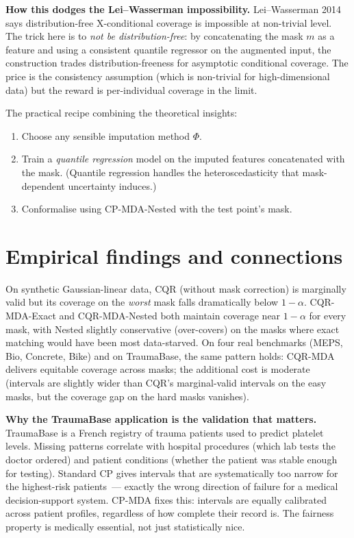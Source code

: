\documentclass[letterpaper,11pt,leqno]{article}
\begin{document}
\begin{keyinsight}
\textbf{How this dodges the Lei--Wasserman impossibility.} Lei--Wasserman 2014 says distribution-free X-conditional coverage is impossible at non-trivial level. The trick here is to \emph{not be distribution-free}: by concatenating the mask $m$ as a feature and using a consistent quantile regressor on the augmented input, the construction trades distribution-freeness for asymptotic conditional coverage. The price is the consistency assumption (which is non-trivial for high-dimensional data) but the reward is per-individual coverage in the limit.
\end{keyinsight}

The practical recipe combining the theoretical insights:
\begin{enumerate}
\item Choose any sensible imputation method $\Phi$.
\item Train a \emph{quantile regression} model on the imputed features concatenated with the mask. (Quantile regression handles the heteroscedasticity that mask-dependent uncertainty induces.)
\item Conformalise using CP-MDA-Nested with the test point's mask.
\end{enumerate}

\section{Empirical findings and connections}\label{s:discussion}

On synthetic Gaussian-linear data, CQR (without mask correction) is marginally valid but its coverage on the \emph{worst} mask falls dramatically below $1 - \alpha$. CQR-MDA-Exact and CQR-MDA-Nested both maintain coverage near $1 - \alpha$ for every mask, with Nested slightly conservative (over-covers) on the masks where exact matching would have been most data-starved. On four real benchmarks (MEPS, Bio, Concrete, Bike) and on TraumaBase, the same pattern holds: CQR-MDA delivers equitable coverage across masks; the additional cost is moderate (intervals are slightly wider than CQR's marginal-valid intervals on the easy masks, but the coverage gap on the hard masks vanishes).

\begin{whymatters}
\textbf{Why the TraumaBase application is the validation that matters.} TraumaBase is a French registry of trauma patients used to predict platelet levels. Missing patterns correlate with hospital procedures (which lab tests the doctor ordered) and patient conditions (whether the patient was stable enough for testing). Standard CP gives intervals that are systematically too narrow for the highest-risk patients~--- exactly the wrong direction of failure for a medical decision-support system. CP-MDA fixes this: intervals are equally calibrated across patient profiles, regardless of how complete their record is. The fairness property is medically essential, not just statistically nice.
\end{whymatters}
\end{document}
